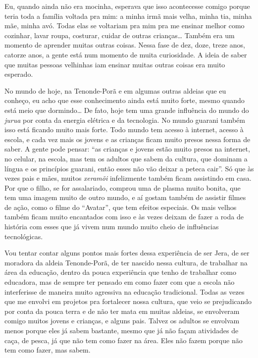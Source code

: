 Eu, quando ainda não era mocinha, esperava que isso acontecesse comigo
porque teria toda a família voltada pra mim: a minha irmã mais velha,
minha tia, minha mãe, minha avó. Todas elas se voltariam pra mim pra me
ensinar melhor como cozinhar, lavar roupa, costurar, cuidar de outras
crianças\ldots{} Também era um momento de aprender muitas outras coisas.
Nessa fase de dez, doze, treze anos, catorze anos, a gente está num
momento de muita curiosidade. A ideia de saber que muitas pessoas
velhinhas iam ensinar muitas outras coisas era muito esperado.

No mundo de hoje, na Tenonde-Porã e em algumas outras aldeias que eu
conheço, eu acho que esse conhecimento ainda está muito forte, mesmo
quando está meio que dormindo\ldots{} De fato, hoje tem uma grande
influência do mundo do \emph{jurua} por conta da energia elétrica e da
tecnologia. No mundo guarani também isso está ficando muito mais forte.
Todo mundo tem acesso à internet, acesso à escola, e cada vez mais os
jovens e as crianças ficam muito presos nessa forma de saber. A gente
pode pensar: ``as crianças e jovens estão muito presos na internet, no
celular, na escola, mas tem os adultos que sabem da cultura, que
dominam a língua e os princípios guarani, então esses não vão deixar a
peteca cair''. Só que às vezes pais e mães, muitos \emph{xeramõi} infelizmente
também ficam assistindo  em casa. Por que o filho, se for
assalariado, comprou uma  de plasma muito bonita, que tem uma imagem
muito de outro mundo, e aí gostam também de assistir filmes de ação,
como o filme do ``Avatar'', que tem efeitos especiais. Os mais velhos
também ficam muito encantados com isso e às vezes deixam de fazer a
roda de história com esses que já vivem num mundo muito cheio de
influências tecnológicas. 

Vou tentar contar alguns pontos mais fortes dessa experiência de ser
Jera, de ser moradora da aldeia Tenonde-Porã, de ter nascido nessa
cultura, de trabalhar na área da educação, dentro da pouca experiência
que tenho de trabalhar como educadora, mas de sempre ter pensado em como
fazer com que a escola não interferisse de maneira muito agressiva na
educação tradicional. Todas as vezes que me envolvi em projetos pra
fortalecer nossa cultura, que veio se prejudicando por conta da pouca
terra e de não ter mata em muitas aldeias, se envolveram comigo muitos
jovens e crianças, e alguns pais. Talvez os adultos se envolvam menos
porque eles já sabem bastante, mesmo que já não façam atividades de
caça, de pesca, já que não tem como fazer na área. Eles não fazem
porque não tem como fazer, mas sabem.

